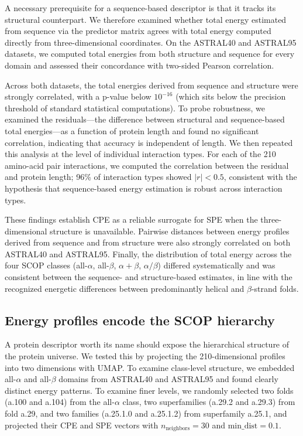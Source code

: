 \documentclass[11pt]{article}
\begin{document}
A necessary prerequisite for a sequence-based descriptor is that it tracks
its structural counterpart. We therefore examined whether total energy
estimated from sequence via the predictor matrix agrees with total energy
computed directly from three-dimensional coordinates. On the ASTRAL40 and
ASTRAL95 datasets, we computed total energies from both structure and
sequence for every domain and assessed their concordance with two-sided
Pearson correlation.

Across both datasets, the total energies derived from sequence and structure
were strongly correlated, with a p-value below $10^{-16}$ (which sits below
the precision threshold of standard statistical computations). To probe
robustness, we examined the residuals---the difference between structural and
sequence-based total energies---as a function of protein length and found no
significant correlation, indicating that accuracy is independent of length.
We then repeated this analysis at the level of individual interaction types.
For each of the 210 amino-acid pair interactions, we computed the correlation
between the residual and protein length; 96\% of interaction types showed
$|r|<0.5$, consistent with the hypothesis that sequence-based energy
estimation is robust across interaction types.

These findings establish CPE as a reliable surrogate for SPE when the
three-dimensional structure is unavailable. Pairwise distances between
energy profiles derived from sequence and from structure were also strongly
correlated on both ASTRAL40 and ASTRAL95. Finally, the distribution of total
energy across the four SCOP classes (all-$\alpha$, all-$\beta$,
$\alpha+\beta$, $\alpha/\beta$) differed systematically and was consistent
between the sequence- and structure-based estimates, in line with the
recognized energetic differences between predominantly helical and
$\beta$-strand folds.

\subsection{Energy profiles encode the SCOP hierarchy}

A protein descriptor worth its name should expose the hierarchical structure
of the protein universe. We tested this by projecting the 210-dimensional
profiles into two dimensions with UMAP. To examine class-level structure, we
embedded all-$\alpha$ and all-$\beta$ domains from ASTRAL40 and ASTRAL95 and
found clearly distinct energy patterns. To examine finer levels, we
randomly selected two folds (a.100 and a.104) from the all-$\alpha$ class,
two superfamilies (a.29.2 and a.29.3) from fold a.29, and two families
(a.25.1.0 and a.25.1.2) from superfamily a.25.1, and projected their CPE and
SPE vectors with $n_\text{neighbors}=30$ and $\text{min\_dist}=0.1$.
\end{document}
